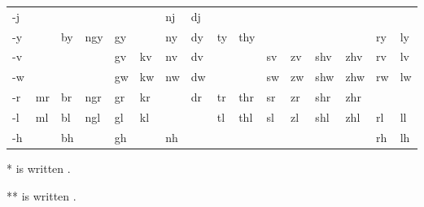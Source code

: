 {\begin{tabular}{ l|l|l|l|l|l|l|l|l|l|l|l|l|l|l|l }
	-j  &      &      &      &      &      & nj   & dj   &      &      &      &      &      &      &      &      \\
	-y  &      & by   & ngy  & gy   &      & ny   & dy   & ty   & thy  &      &      &      &      & ry   & ly   \\
	-v  &      &      &      & gv   & kv   & nv   & dv   &      &      & sv   & zv   & shv  & zhv  & rv   & lv   \\
	-w  &      &      &      & gw   & kw   & nw   & dw   &      &      & sw   & zw   & shw  & zhw  & rw   & lw   \\
	-r  & mr   & br   & ngr  & gr   & kr   &      & dr   & tr   & thr  & sr   & zr   & shr  & zhr  &      &      \\
	-l  & ml   & bl   & ngl  & gl   & kl   &      &      & tl   & thl  & sl   & zl   & shl  & zhl  & rl   & ll   \\
	-h  &      & bh   &      & gh   &      & nh   &      &      &      &      &      &      &      & rh   & lh   \\
\end{tabular}}

*  is written .

**  is written .

